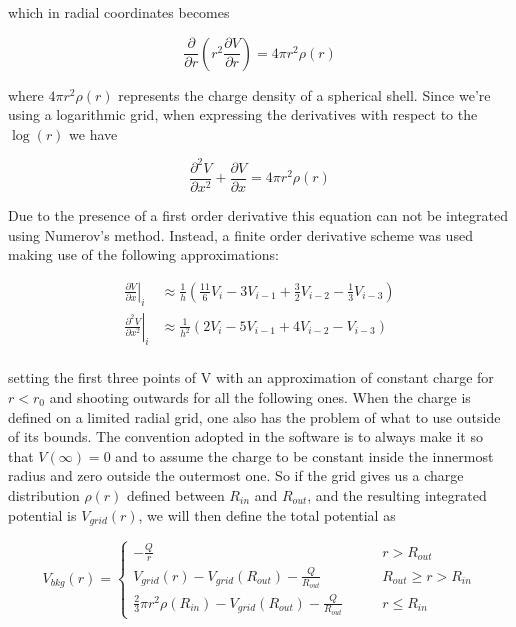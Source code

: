 \documentclass[]{report}
\begin{document}
which in radial coordinates becomes

\begin{equation}
	\frac{\partial}{\partial r}\left(r^2	\frac{\partial V}{\partial r}\right) = 4\pi r^2 \rho(r)
\end{equation}

where $4\pi r^2 \rho(r)$ represents the charge density of a spherical shell. Since we're using a logarithmic grid, when expressing the derivatives with respect to the $\log(r)$ we have

\begin{equation}
\frac{\partial^2 V}{\partial x^2} + \frac{\partial V}{\partial x}= 4\pi r^2 \rho(r)
\end{equation}

Due to the presence of a first order derivative this equation can not be integrated using Numerov's method. Instead, a finite order derivative scheme was used making use of the following approximations:

\begin{align}
\left.\frac{\partial V}{\partial x}\right|_i &\approx \frac{1}{h}\left(\frac{11}{6}V_i -3V_{i-1} +\frac{3}{2}V_{i-2}-\frac{1}{3}V_{i-3} \right) \\
\left.\frac{\partial^2 V}{\partial x^2}\right|_i &\approx \frac{1}{h^2}\left(2V_i -5V_{i-1} +4V_{i-2}-V_{i-3} \right) \\
\end{align}

setting the first three points of V with an approximation of constant charge for $r < r_0$ and shooting outwards for all the following ones.\newline 
When the charge is defined on a limited radial grid, one also has the problem of what to use outside of its bounds. The convention adopted in the software is to always make it so that $V(\infty) = 0$ and to assume the charge to be constant inside the innermost radius and zero outside the outermost one. So if the grid gives us a charge distribution $\rho(r)$ defined between $R_{in}$ and $R_{out}$, and the resulting integrated potential is $V_{grid}(r)$, we will then define the total potential as

\begin{equation}
V_{bkg}(r) = \begin{cases}
-\frac{Q}{r}\qquad & r > R_{out} \\
V_{grid}(r) -V_{grid}(R_{out}) - \frac{Q}{R_{out}} \qquad & R_{out} \geq r > R_{in} \\
\frac{2}{3}\pi r^2\rho(R_{in})-V_{grid}(R_{out}) - \frac{Q}{R_{out}} \qquad & r \leq R_{in}
\end{cases}
\end{equation} 
\end{document}
